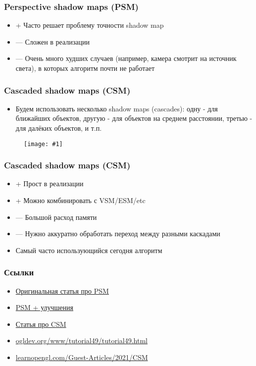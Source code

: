 \documentclass{beamer}
\newcommand{\slideimage}[1]{
  \begin{figure}
    \begin{adjustbox}{width=\textwidth, totalheight=\textheight-2\baselineskip-2\baselineskip,keepaspectratio}
      \texttt{[image: \#1]}
    \end{adjustbox}
  \end{figure}
}
\begin{document}
\begin{frame}[fragile]
\frametitle{Perspective shadow maps (PSM)}
\begin{itemize}
\item {\color{green}+} Часто решает проблему точности shadow map
\item {\color{red}—} Сложен в реализации
\item {\color{red}—} Очень много худших случаев (например, камера смотрит на источник света), в которых алгоритм почти не работает
\end{itemize}
\end{frame}

\begin{frame}[fragile]
\frametitle{Cascaded shadow maps (CSM)}
\begin{itemize}
\item Будем использовать несколько shadow maps (cascades): одну - для ближайших объектов, другую - для объектов на среднем расстоянии, третью - для далёких объектов, и т.п.
\end{itemize}
\slideimage{csm.jpg}
\end{frame}

\begin{frame}[fragile]
\frametitle{Cascaded shadow maps (CSM)}
\begin{itemize}
\item {\color{green}+} Прост в реализации
\item {\color{green}+} Можно комбинировать с VSM/ESM/etc
\item {\color{red}—} Большой расход памяти
\item {\color{red}—} Нужно аккуратно обработать переход между разными каскадами
\item Самый часто использующийся сегодня алгоритм
\end{itemize}
\end{frame}

\begin{frame}[fragile]
\frametitle{Ссылки}
\begin{itemize}
\item \href{https://www-sop.inria.fr/reves/Basilic/2002/SD02/PerspectiveShadowMaps.pdf}{Оригинальная статья про PSM}
\item \href{https://developer.download.nvidia.com/books/HTML/gpugems/gpugems_ch14.html}{PSM + улучшения}
\item \href{https://developer.download.nvidia.com/SDK/10.5/opengl/src/cascaded_shadow_maps/doc/cascaded_shadow_maps.pdf}{Статья про CSM}
\item \href{https://ogldev.org/www/tutorial49/tutorial49.html}{ogldev.org/www/tutorial49/tutorial49.html}
\item \href{https://learnopengl.com/Guest-Articles/2021/CSM}{learnopengl.com/Guest-Articles/2021/CSM}
\end{itemize}
\end{frame}
\end{document}
